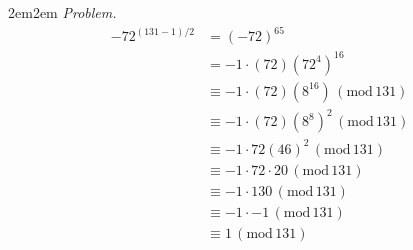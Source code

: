 \documentclass[10pt,oneside]{book}
\newcommand{\gspc}{\vspace{0.13cm}} %
\newcommand{\gmod}[1]{\,(\text{mod}\,#1)}
\let\endoldproof\endproof
\newenvironment{problem}[1]
  {\vspace{-0.1cm}\begin{coloredadjust}\begin{adjustwidth}{2em}{2em}
   \textit{Problem. }#1}
  {\endoldproof
\end{adjustwidth}\end{coloredadjust}\gspc}
\begin{document}
\begin{enumerate}
\begin{enumerate}
\begin{problem}
      \begin{align*}
        -72^{(131-1)/2} &= (-72)^{65}\\
        &= -1 \cdot (72)(72^4)^{16}\\
        &\equiv -1 \cdot (72) (8^{16})\gmod{131}\\
        &\equiv -1 \cdot (72)(8^8)^2 \gmod {131}\\
        &\equiv -1 \cdot 72(46)^2 \gmod {131}\\
        &\equiv -1 \cdot 72\cdot 20 \gmod{131}\\
        &\equiv -1 \cdot 130 \gmod{131}\\
        &\equiv -1 \cdot -1 \gmod{131}\\
        &\equiv 1 \gmod{131}
      \end{align*}
    \end{problem}
  \end{enumerate}
\end{enumerate}
\end{document}
